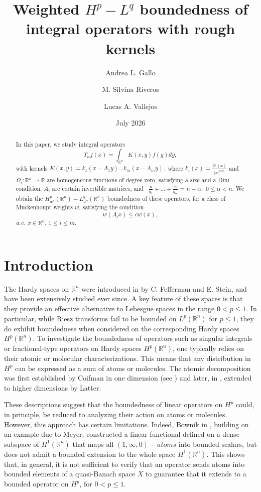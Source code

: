 \documentclass[a4paper,12pt,reqno]{amsart}
\title{Weighted $H^p\!- \! L^q$ boundedness  of  integral operators with rough kernels}
\author[A. L. Gallo]{Andrea L. Gallo}
\author[M. S. Riveros]{M. Silvina Riveros}
\author[L. A. Vallejos]{Lucas A. Vallejos}
\date{July 2026}
\numberwithin{equation}{section}
\begin{document}
	
	\maketitle
	
	\begin{abstract}
		In this paper, we study integral operators 
		\begin{equation*}
			T_\alpha f(x)=\int_{\mathbb{R}^{n}}K(x,y) f(y)dy,
		\end{equation*}
		with kernels $K(x,y)= k_1( x- A_1y)...k_m( x-A_my),$
		where $k_i(x)=\frac{\Omega_i(x)}{|x|^{n/q_i}}$ and $\Omega_i: \mathbb{R}^n\to \mathbb{R}$  are  homogeneous functions of degree zero, satisfying a size and a Dini condition, $A_{i}$ are certain invertible matrices, and  \   $\frac n{q_1}+\dots + \frac n{q_m}=n-\alpha,$  $0\leq \alpha <n.$
		We obtain the $H^{p}_{w^p}(\mathbb{R}^{n})-L^{q}_{w^q}(\mathbb{R}^{n})$  boundedness of these operators, for a class of Muckenhoupt weights $w$, satisfying the condition 
		\begin{equation*}
			w(A_ix)\leq cw(x),
		\end{equation*}
		\emph{ a.e.} $x\in\mathbb{R} ^n $, $1\leq i\leq m$.
	\end{abstract}
	
	
	\section{Introduction}
	
	The Hardy spaces on $\mathbb{R}^n$ were introduced in \cite{FS} by C. Fefferman and E. Stein, and have been extensively studied ever since. 
	A key feature of these spaces is that they provide an effective alternative to Lebesgue spaces in the range $0<p\leq 1$. 
	In particular, while Riesz transforms fail to be bounded on $L^p(\mathbb{R}^n)$ for $p\leq 1$, they do exhibit boundedness when considered on the corresponding Hardy spaces $H^p(\mathbb{R}^n)$.
	To investigate the boundedness of operators such as singular integrals or fractional-type operators on Hardy spaces $H^p(\mathbb{R}^n)$, one typically relies on their atomic or molecular characterizations. 
	This means that any distribution in $H^p$ can be expressed as a sum of atoms or molecules. 
	The atomic decomposition was first established by Coifman in one dimension (see \cite{C}) and later, in \cite{L}, extended to higher dimensions by Latter. 
	
	These descriptions suggest that the boundedness of linear operators on $H^p$ could, in principle, be reduced to analyzing their action on atoms or molecules. However, this approach has certain limitations. 
	Indeed, Bownik in \cite{B}, building on an example due to Meyer, constructed a linear functional defined on a dense subspace of $H^1(\mathbb{R}^n)$ that maps all $(1,\infty,0)-atoms$ into bounded scalars, but does not admit a bounded extension to the whole space $H^1(\mathbb{R}^n)$. This shows that, in general, it is not sufficient to verify that an operator sends atoms into bounded elements of a quasi-Banach space $X$ to guarantee that it extends to a bounded operator on $H^p$, for $0<p\leq 1$. 
	
\end{document}

